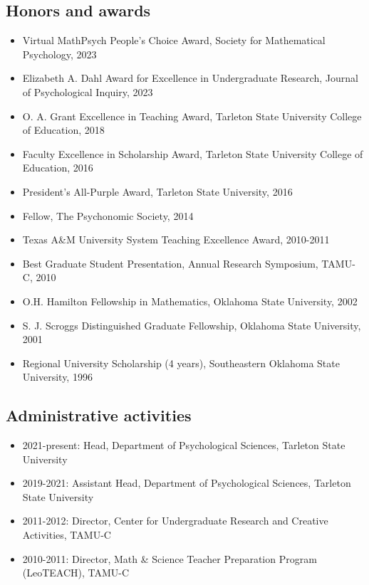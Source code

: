 \documentclass[article,10pt]{article}
\begin{document}
\subsection*{Honors and awards}
\label{sec:org99a25af}
\begin{itemize}
\item Virtual MathPsych People's Choice Award, Society for Mathematical Psychology, 2023
\item Elizabeth A. Dahl Award for Excellence in Undergraduate Research, Journal of Psychological Inquiry, 2023
\item O. A. Grant Excellence in Teaching Award, Tarleton State University College of Education, 2018
\item Faculty Excellence in Scholarship Award, Tarleton State University College of Education, 2016
\item President's All-Purple Award, Tarleton State University, 2016
\item Fellow, The Psychonomic Society, 2014
\item Texas A\&M University System Teaching Excellence Award, 2010-2011
\item Best Graduate Student Presentation, Annual Research Symposium, TAMU-C, 2010
\item O.H. Hamilton Fellowship in Mathematics, Oklahoma State University, 2002
\item S. J. Scroggs Distinguished Graduate Fellowship, Oklahoma State University, 2001
\item Regional University Scholarship (4 years), Southeastern Oklahoma State University, 1996
\end{itemize}

\subsection*{Administrative activities}
\label{sec:org1aa2b25}
\begin{itemize}
\item 2021-present: Head, Department of Psychological Sciences, Tarleton State University
\item 2019-2021: Assistant Head, Department of Psychological Sciences, Tarleton State University
\item 2011-2012: Director, Center for Undergraduate Research and Creative Activities, TAMU-C
\item 2010-2011: Director, Math \& Science Teacher Preparation Program (LeoTEACH), TAMU-C
\end{itemize}
\end{document}
